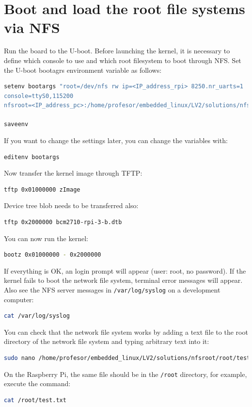 \documentclass[11pt]{article}
\begin{document}
\section{Boot and load the root file systems via NFS}
Run the board to the U-boot. Before launching the kernel, it is necessary to
 define which console to use and which root filesystem to boot through NFS. Set
 the U-boot bootagrs environment variable as follows:
\begin{lstlisting}[language=bash]
setenv bootargs "root=/dev/nfs rw ip=<IP_address_rpi> 8250.nr_uarts=1
console=ttyS0,115200
nfsroot=<IP_address_pc>:/home/profesor/embedded_linux/LV2/solutions/nfsroot"

saveenv
\end{lstlisting}
If you want to change the settings later, you can change the variables with:
\begin{lstlisting}[language=bash]
editenv bootargs
\end{lstlisting}
Now transfer the kernel image through TFTP:
\begin{lstlisting}[language=bash]
tftp 0x01000000 zImage
\end{lstlisting}
Device tree blob needs to be transferred also:
\begin{lstlisting}[language=bash]
tftp 0x2000000 bcm2710-rpi-3-b.dtb
\end{lstlisting}
You can now run the kernel:
\begin{lstlisting}[language=bash]
bootz 0x01000000 - 0x2000000
\end{lstlisting}
If everything is OK, an login prompt will appear (user: root, no password).
If the kernel fails to boot the network file system, terminal error messages
 will appear. Also see the NFS server messages in \texttt{/var/log/syslog} on a
 development computer:
\begin{lstlisting}[language=bash]
cat /var/log/syslog
\end{lstlisting}
You can check that the network file system works by adding a text file to the
 root directory of the network file system and typing arbitrary text into it:
\begin{lstlisting}[language=bash]
sudo nano /home/profesor/embedded_linux/LV2/solutions/nfsroot/root/test.txt
\end{lstlisting}
On the Raspberry Pi, the same file should be in the \texttt{/root} directory,
 for example, execute the command:
\begin{lstlisting}[language=bash]
cat /root/test.txt
\end{lstlisting}
\end{document}
